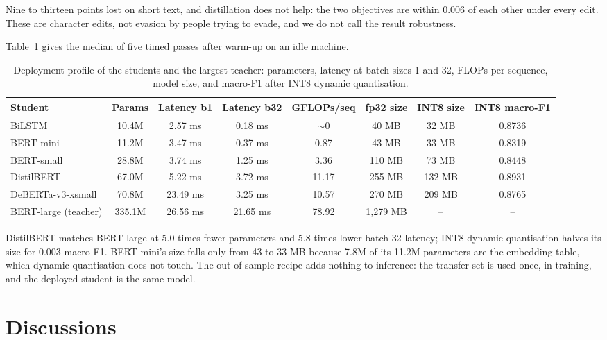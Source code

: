Nine to thirteen points lost on short text, and distillation does not help: the two objectives are
within 0.006 of each other under every edit. These are character edits, not evasion by people trying
to evade, and we do not call the result robustness.

Table~\ref{tab:efficiency} gives the median of five timed passes after warm-up on an idle machine.

\begin{table}[htbp]
\centering
\small
\caption[Deployment profile of the students and the largest teacher]{Deployment profile of the students and the largest teacher: parameters, latency at batch sizes 1 and 32, FLOPs per sequence, model size, and macro-F1 after INT8 dynamic quantisation.}
\label{tab:efficiency}
\begin{adjustbox}{max width=\textwidth}
\begin{tabular}{lccccccc}
\toprule
Student & Params & Latency b1 & Latency b32 & GFLOPs/seq & fp32 size & INT8 size & INT8 macro-F1 \\
\midrule
BiLSTM & 10.4M & 2.57 ms & 0.18 ms & $\sim$0 & 40 MB & 32 MB & 0.8736 \\
BERT-mini & 11.2M & 3.47 ms & 0.37 ms & 0.87 & 43 MB & 33 MB & 0.8319 \\
BERT-small & 28.8M & 3.74 ms & 1.25 ms & 3.36 & 110 MB & 73 MB & 0.8448 \\
DistilBERT & 67.0M & 5.22 ms & 3.72 ms & 11.17 & 255 MB & 132 MB & 0.8931 \\
DeBERTa-v3-xsmall & 70.8M & 23.49 ms & 3.25 ms & 10.57 & 270 MB & 209 MB & 0.8765 \\
BERT-large (teacher) & 335.1M & 26.56 ms & 21.65 ms & 78.92 & 1,279 MB & -- & -- \\
\bottomrule
\end{tabular}
\end{adjustbox}
\end{table}

DistilBERT matches BERT-large at 5.0 times fewer parameters and 5.8 times lower batch-32 latency;
INT8 dynamic quantisation halves its size for 0.003 macro-F1. BERT-mini's size falls only from 43 to
33 MB because 7.8M of its 11.2M parameters are the embedding table, which dynamic quantisation does
not touch. The out-of-sample recipe adds nothing to inference: the transfer set is used once, in
training, and the deployed student is the same model.
\section{Discussions}
\label{sec:5.discuss}

